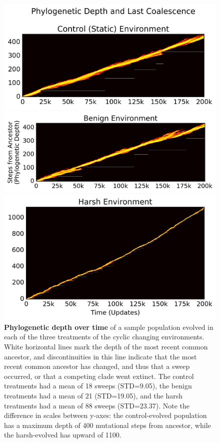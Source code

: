 \documentclass[10pt,letterpaper,final]{article}
\begin{document}
	\begin{figure}[!h]
	\includegraphics[trim={-0.88cm 0 0.25cm 0},clip,width=0.65\columnwidth]{figures/CE/control__phylodepth_with_coalescense.png}

	\includegraphics[trim={0.2cm 0 0.25cm 0},clip,width=0.65\columnwidth]{figures/CE/benign__phylodepth_with_coalescense.png}
	
	\includegraphics[trim={-0.63cm 0 0.25cm 0},clip,width=0.65\columnwidth]{figures/CE/harsh__phylodepth_with_coalescense.png}
	\caption{\textbf{Phylogenetic depth over time} of a sample population evolved in each of the three treatments of the cyclic changing environments. White horizontal lines mark the depth of the most recent common ancestor, and discontinuities in this line indicate that the most recent common ancestor has changed, and thus that a sweep occurred, or that a competing clade went extinct. The control treatments had a mean of 18 sweeps (STD=9.05), the benign treatments had a mean of 21 (STD=19.05), and the harsh treatments had a mean of 88 sweeps (STD=23.37). Note the difference in scales between y-axes: the control-evolved population has a maximum depth of 400 mutational steps from ancestor, while the harsh-evolved has upward of 1100. %
	}\label{fig:flamegraph}
	\end{figure}
\end{document}
